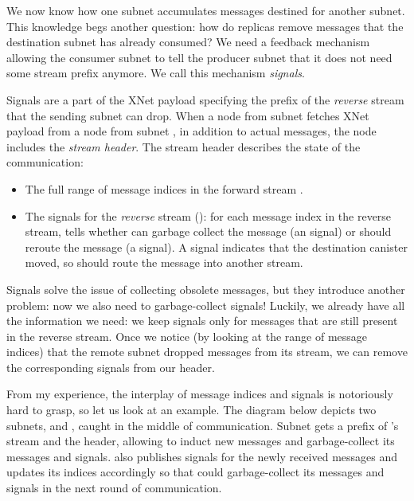\documentclass{article}
\begin{document}
We now know how one subnet accumulates messages destined for another subnet.
This knowledge begs another question: how do replicas remove messages that the destination subnet has already consumed?
We need a feedback mechanism allowing the consumer subnet to tell the producer subnet that it does not need some stream prefix anymore.
We call this mechanism \emph{signals}.

Signals are a part of the XNet payload specifying the prefix of the \emph{reverse} stream that the sending subnet can drop.
When a node from subnet  fetches XNet payload from a node from subnet , in addition to actual messages, the  node includes the \emph{stream header}.
The stream header describes the state of the  communication:

\begin{itemize}
  \item
    The full range of message indices in the forward stream .
  \item
    The signals for the \emph{reverse} stream (): for each message index in the reverse stream,  tells whether  can garbage collect the message (an  signal) or should reroute the message (a  signal).
    A  signal indicates that the destination canister moved, so  should route the message into another stream.
\end{itemize}

Signals solve the issue of collecting obsolete messages, but they introduce another problem: now we also need to garbage-collect signals!
Luckily, we already have all the information we need: we keep signals only for messages that are still present in the reverse stream.
Once we notice (by looking at the range of message indices) that the remote subnet dropped messages from its stream, we can remove the corresponding signals from our header.

From my experience, the interplay of message indices and signals is notoriously hard to grasp, so let us look at an example.
The diagram below depicts two subnets,  and , caught in the middle of communication.
Subnet  gets a prefix of 's stream and the header, allowing  to induct new messages and garbage-collect its messages and signals.
 also publishes signals for the newly received messages and updates its indices accordingly so that  could garbage-collect its messages and signals in the next round of communication.
\end{document}
